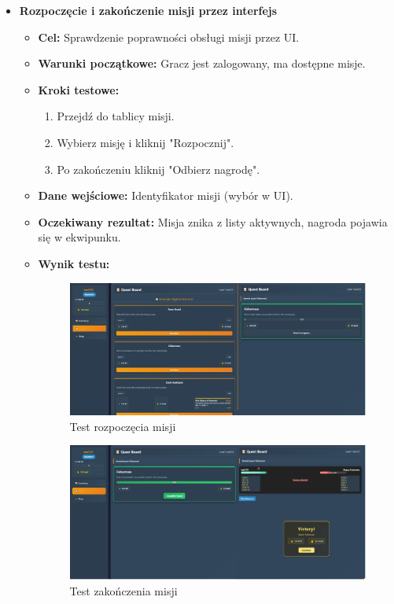 \begin{itemize}
    \item \textbf{Rozpoczęcie i zakończenie misji przez interfejs}
    \begin{itemize}
        \item \textbf{Cel:} Sprawdzenie poprawności obsługi misji przez UI.
        \item \textbf{Warunki początkowe:} Gracz jest zalogowany, ma dostępne misje.
        \item \textbf{Kroki testowe:}
        \begin{enumerate}
            \item Przejdź do tablicy misji.
            \item Wybierz misję i kliknij "Rozpocznij".
            \item Po zakończeniu kliknij "Odbierz nagrodę".
        \end{enumerate}
        \item \textbf{Dane wejściowe:} Identyfikator misji (wybór w UI).
        \item \textbf{Oczekiwany rezultat:} Misja znika z listy aktywnych, nagroda pojawia się w ekwipunku.
        \item \textbf{Wynik testu:}
        \begin{figure}[H]
            \includegraphics[width=480px]{figures/testy/test-startquest-front.png}
            \caption{Test rozpoczęcia misji}
        \end{figure}
        \begin{figure}[H]
            \includegraphics[width=480px]{figures/testy/test-completequest-front.png}
            \caption{Test zakończenia misji}
        \end{figure}
    \end{itemize}


\end{itemize}
